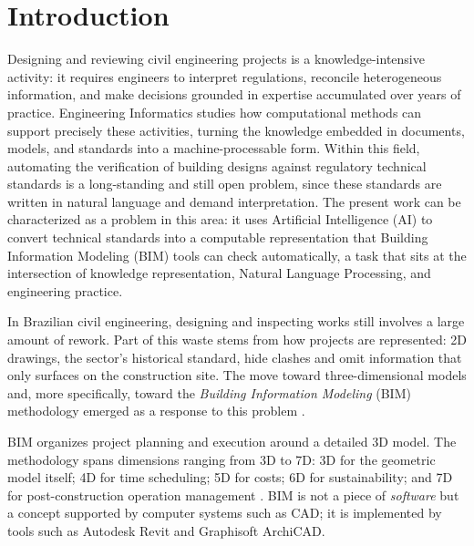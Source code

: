\documentclass[a4paper,fleqn]{cas-sc}
\begin{document}
\maketitle

\section{Introduction}\label{sec:introduction}
Designing and reviewing civil engineering projects is a knowledge-intensive activity: it requires engineers to interpret regulations, reconcile heterogeneous information, and make decisions grounded in expertise accumulated over years of practice. Engineering Informatics studies how computational methods can support precisely these activities, turning the knowledge embedded in documents, models, and standards into a machine-processable form. Within this field, automating the verification of building designs against regulatory technical standards is a long-standing and still open problem, since these standards are written in natural language and demand interpretation. The present work can be characterized as a problem in this area: it uses Artificial Intelligence (AI) to convert technical standards into a computable representation that Building Information Modeling (BIM) tools can check automatically, a task that sits at the intersection of knowledge representation, Natural Language Processing, and engineering practice.

In Brazilian civil engineering, designing and inspecting works still involves a large amount of rework. Part of this waste stems from how projects are represented: 2D drawings, the sector's historical standard, hide clashes and omit information that only surfaces on the construction site. The move toward three-dimensional models and, more specifically, toward the \textit{Building Information Modeling} (BIM) methodology emerged as a response to this problem \citep{eastman2011}.

BIM organizes project planning and execution around a detailed 3D model. The methodology spans dimensions ranging from 3D to 7D: 3D for the geometric model itself; 4D for time scheduling; 5D for costs; 6D for sustainability; and 7D for post-construction operation management \citep{eastman2011}. BIM is not a piece of \textit{software} but a concept supported by computer systems such as CAD; it is implemented by tools such as Autodesk Revit and Graphisoft ArchiCAD.
\end{document}

